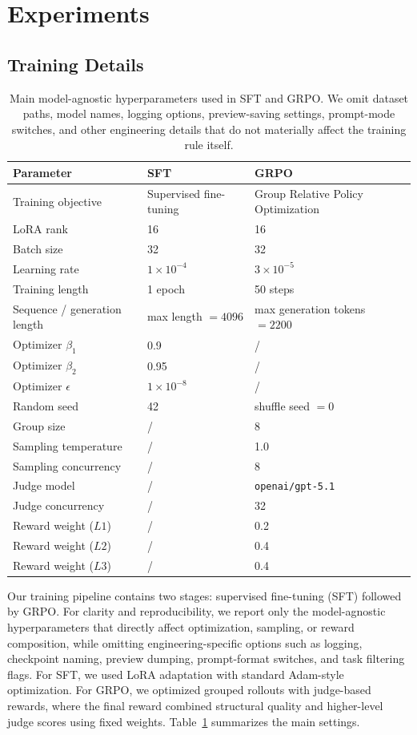 \section{Experiments}
\subsection{Training Details}
\begin{table}[t]
  \centering
  \small
  \setlength{\tabcolsep}{8pt}
  \begin{tabular}{lll}
  \toprule
  \textbf{Parameter} & \textbf{SFT} & \textbf{GRPO} \\
  \midrule
  Training objective & Supervised fine-tuning & Group Relative Policy Optimization \\
  LoRA rank & 16 & 16 \\
  Batch size & 32 & 32 \\
  Learning rate & $1\times10^{-4}$ & $3\times10^{-5}$ \\
  Training length & 1 epoch & 50 steps \\
  Sequence / generation length & max length $=4096$ & max generation tokens $=2200$ \\
  Optimizer $\beta_1$ & 0.9 & / \\
  Optimizer $\beta_2$ & 0.95 & / \\
  Optimizer $\epsilon$ & $1\times10^{-8}$ & / \\
  Random seed & 42 & shuffle seed $=0$ \\
  Group size & / & 8 \\
  Sampling temperature & / & 1.0 \\
  Sampling concurrency & / & 8 \\
  Judge model & / & \texttt{openai/gpt-5.1} \\
  Judge concurrency & / & 32 \\
  Reward weight ($L1$) & / & 0.2 \\
  Reward weight ($L2$) & / & 0.4 \\
  Reward weight ($L3$) & / & 0.4 \\
  \bottomrule
  \end{tabular}
  \caption{Main model-agnostic hyperparameters used in SFT and GRPO. We omit dataset paths, model names, logging options, preview-saving settings,
  prompt-mode switches, and other engineering details that do not materially affect the training rule itself.}
  \label{tab:appendix_training_hparams}
  \end{table}

Our training pipeline contains two stages: supervised fine-tuning (SFT) followed by GRPO.
  For clarity and reproducibility, we report only the model-agnostic hyperparameters that directly affect optimization, sampling, or reward
  composition, while omitting engineering-specific options such as logging, checkpoint naming, preview dumping, prompt-format switches, and task
  filtering flags.
  For SFT, we used LoRA adaptation with standard Adam-style optimization.
  For GRPO, we optimized grouped rollouts with judge-based rewards, where the final reward combined structural quality and higher-level judge scores
  using fixed weights.
  Table~\ref{tab:appendix_training_hparams} summarizes the main settings.